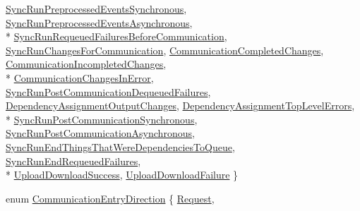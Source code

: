 \begin{DoxyCompactItemize}
\hyperlink{namespace_cloud_api_public_1_1_static_a9082ca8fb56ff22723a53cd835e02451}{Sync\-Run\-Preprocessed\-Events\-Synchronous}, 
\hyperlink{namespace_cloud_api_public_1_1_static_a9082ca8fb56ff22723a53cd835e02451}{Sync\-Run\-Preprocessed\-Events\-Asynchronous}, 
\\*
\hyperlink{namespace_cloud_api_public_1_1_static_a9082ca8fb56ff22723a53cd835e02451}{Sync\-Run\-Requeued\-Failures\-Before\-Communication}, 
\hyperlink{namespace_cloud_api_public_1_1_static_a9082ca8fb56ff22723a53cd835e02451}{Sync\-Run\-Changes\-For\-Communication}, 
\hyperlink{namespace_cloud_api_public_1_1_static_a9082ca8fb56ff22723a53cd835e02451}{Communication\-Completed\-Changes}, 
\hyperlink{namespace_cloud_api_public_1_1_static_a9082ca8fb56ff22723a53cd835e02451}{Communication\-Incompleted\-Changes}, 
\\*
\hyperlink{namespace_cloud_api_public_1_1_static_a9082ca8fb56ff22723a53cd835e02451}{Communication\-Changes\-In\-Error}, 
\hyperlink{namespace_cloud_api_public_1_1_static_a9082ca8fb56ff22723a53cd835e02451}{Sync\-Run\-Post\-Communication\-Dequeued\-Failures}, 
\hyperlink{namespace_cloud_api_public_1_1_static_a9082ca8fb56ff22723a53cd835e02451}{Dependency\-Assignment\-Output\-Changes}, 
\hyperlink{namespace_cloud_api_public_1_1_static_a9082ca8fb56ff22723a53cd835e02451}{Dependency\-Assignment\-Top\-Level\-Errors}, 
\\*
\hyperlink{namespace_cloud_api_public_1_1_static_a9082ca8fb56ff22723a53cd835e02451}{Sync\-Run\-Post\-Communication\-Synchronous}, 
\hyperlink{namespace_cloud_api_public_1_1_static_a9082ca8fb56ff22723a53cd835e02451}{Sync\-Run\-Post\-Communication\-Asynchronous}, 
\hyperlink{namespace_cloud_api_public_1_1_static_a9082ca8fb56ff22723a53cd835e02451}{Sync\-Run\-End\-Things\-That\-Were\-Dependencies\-To\-Queue}, 
\hyperlink{namespace_cloud_api_public_1_1_static_a9082ca8fb56ff22723a53cd835e02451}{Sync\-Run\-End\-Requeued\-Failures}, 
\\*
\hyperlink{namespace_cloud_api_public_1_1_static_a9082ca8fb56ff22723a53cd835e02451}{Upload\-Download\-Success}, 
\hyperlink{namespace_cloud_api_public_1_1_static_a9082ca8fb56ff22723a53cd835e02451}{Upload\-Download\-Failure}
 \}
\begin{DoxyCompactList}\small\item\em \end{DoxyCompactList}\item 
enum \hyperlink{namespace_cloud_api_public_1_1_static_a5c3e1c9c171c6fc2d14d98e753f33c72}{Communication\-Entry\-Direction} \{ \hyperlink{namespace_cloud_api_public_1_1_static_a5c3e1c9c171c6fc2d14d98e753f33c72}{Request}, 

\end{DoxyCompactItemize}
